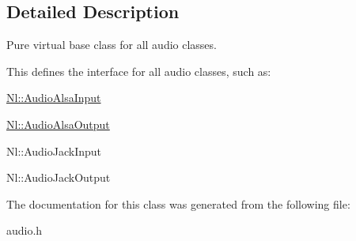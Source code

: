 \subsection{Detailed Description}
Pure virtual base class for all audio classes. 

This defines the interface for all audio classes, such as\-:
\begin{DoxyItemize}
\item \hyperlink{classNl_1_1AudioAlsaInput}{Nl\-::\-Audio\-Alsa\-Input}
\item \hyperlink{classNl_1_1AudioAlsaOutput}{Nl\-::\-Audio\-Alsa\-Output}
\item Nl\-::\-Audio\-Jack\-Input
\item Nl\-::\-Audio\-Jack\-Output 
\end{DoxyItemize}

The documentation for this class was generated from the following file\-:\begin{DoxyCompactItemize}
\item 
audio.\-h\end{DoxyCompactItemize}
